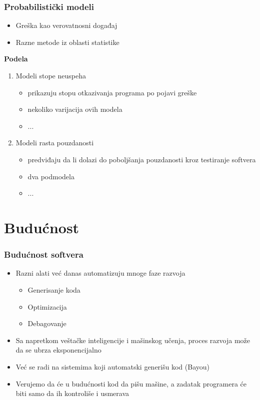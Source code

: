 \documentclass{beamer}
\begin{document}
\begin{frame}
\frametitle{Probabilistički modeli}

\begin{itemize}

\item Greška kao verovatnosni događaj
\item Razne metode iz oblasti statistike

\end{itemize}

\textbf{Podela}
\begin{enumerate}
\item Modeli stope neuspeha
\begin{itemize}
\item prikazuju stopu otkazivanja programa po pojavi greške
\item nekoliko varijacija ovih modela
\item ...
\end{itemize}
\item Modeli rasta pouzdanosti
\begin{itemize}
\item predviđaju da li dolazi do poboljšanja pouzdanosti kroz testiranje softvera
\item dva podmodela
\item ...
\end{itemize}
\end{enumerate}

\end{frame}

\section{Budućnost}
\begin{frame}
\frametitle{Budućnost softvera}

\begin{itemize}
\item Razni alati već danas automatizuju mnoge faze razvoja
\begin{itemize}
\item Generisanje koda
\item Optimizacija
\item Debagovanje
\end{itemize}

\item Sa napretkom veštačke inteligencije i mašinskog učenja, proces razvoja može da se ubrza eksponencijalno
\item Već se radi na sistemima koji automatski generišu kod (Bayou)
\item Verujemo da će u budućnosti kod da pišu mašine, a zadatak programera će biti samo da ih kontroliše i usmerava
\end{itemize}

\end{frame}
\end{document}
